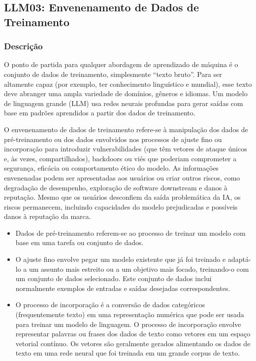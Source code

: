 \documentclass[
]{article}
\author{}
\date{}
\providecommand{\tightlist}{%
  \setlength{\itemsep}{0pt}\setlength{\parskip}{0pt}}
\begin{document}
\subsection{LLM03: Envenenamento de Dados de
Treinamento}\label{llm03-envenenamento-de-dados-de-treinamento}

\subsubsection{Descrição}\label{descriuxe7uxe3o}

O ponto de partida para qualquer abordagem de aprendizado de máquina é o
conjunto de dados de treinamento, simplesmente ``texto bruto''. Para ser
altamente capaz (por exemplo, ter conhecimento linguístico e mundial),
esse texto deve abranger uma ampla variedade de domínios, gêneros e
idiomas. Um modelo de linguagem grande (LLM) usa redes neurais profundas
para gerar saídas com base em padrões aprendidos a partir dos dados de
treinamento.

O envenenamento de dados de treinamento refere-se à manipulação dos
dados de pré-treinamento ou dos dados envolvidos nos processos de ajuste
fino ou incorporação para introduzir vulnerabilidades (que têm vetores
de ataque únicos e, às vezes, compartilhados), backdoors ou viés que
poderiam comprometer a segurança, eficácia ou comportamento ético do
modelo. As informações envenenadas podem ser apresentadas aos usuários
ou criar outros riscos, como degradação de desempenho, exploração de
software downstream e danos à reputação. Mesmo que os usuários
desconfiem da saída problemática da IA, os riscos permanecem, incluindo
capacidades do modelo prejudicadas e possíveis danos à reputação da
marca.

\begin{itemize}
\tightlist
\item
  Dados de pré-treinamento referem-se ao processo de treinar um modelo
  com base em uma tarefa ou conjunto de dados.
\item
  O ajuste fino envolve pegar um modelo existente que já foi treinado e
  adaptá-lo a um assunto mais estreito ou a um objetivo mais focado,
  treinando-o com um conjunto de dados selecionado. Este conjunto de
  dados inclui normalmente exemplos de entradas e saídas desejadas
  correspondentes.
\item
  O processo de incorporação é a conversão de dados categóricos
  (frequentemente texto) em uma representação numérica que pode ser
  usada para treinar um modelo de linguagem. O processo de incorporação
  envolve representar palavras ou frases dos dados de texto como vetores
  em um espaço vetorial contínuo. Os vetores são geralmente gerados
  alimentando os dados de texto em uma rede neural que foi treinada em
  um grande corpus de texto.
\end{itemize}
\end{document}
